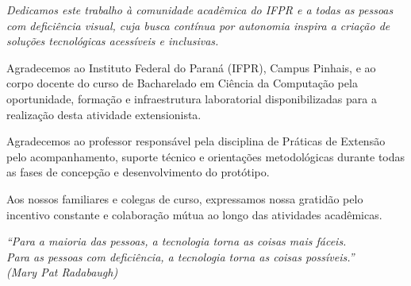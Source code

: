 \begin{dedicatoria}
   \vspace*{\fill}
   \centering
   \noindent
   \textit{Dedicamos este trabalho à comunidade acadêmica do IFPR e a todas as pessoas com deficiência visual, cuja busca contínua por autonomia inspira a criação de soluções tecnológicas acessíveis e inclusivas.} \vspace*{\fill}
\end{dedicatoria}

\begin{agradecimentos}
Agradecemos ao Instituto Federal do Paraná (IFPR), Campus Pinhais, e ao corpo docente do curso de Bacharelado em Ciência da Computação pela oportunidade, formação e infraestrutura laboratorial disponibilizadas para a realização desta atividade extensionista.

Agradecemos ao professor responsável pela disciplina de Práticas de Extensão pelo acompanhamento, suporte técnico e orientações metodológicas durante todas as fases de concepção e desenvolvimento do protótipo.

Aos nossos familiares e colegas de curso, expressamos nossa gratidão pelo incentivo constante e colaboração mútua ao longo das atividades acadêmicas.
\end{agradecimentos}

\begin{epigrafe}
    \vspace*{\fill}
	\begin{flushright}
		\textit{``Para a maioria das pessoas, a tecnologia torna as coisas mais fáceis.\\
		Para as pessoas com deficiência, a tecnologia torna as coisas possíveis.''\\
		(Mary Pat Radabaugh)}
	\end{flushright}
\end{epigrafe}
